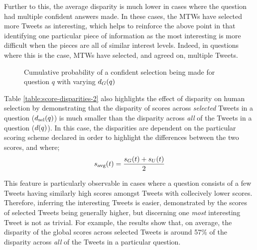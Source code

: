 Further to this, the average disparity is much lower in cases where the question had multiple confident answers made. In these cases, the MTWs have selected more Tweets as interesting, which helps to reinforce the above point in that identifying one particular piece of information as the most interesting is more difficult when the pieces are all of similar interest levels. Indeed, in questions where this is the case, MTWs have selected, and agreed on, multiple Tweets. 

 \begin{figure}[h]
\centering
{}
\caption{Cumulative probability of a confident selection being made for question $q$ with varying $d_G(q)$}
\label{fig:cum-question-disparity}
\end{figure}

Table \ref{table:score-disparities-2} also highlights the effect of disparity on human selection by demonstrating that the disparity of scores across \textit{selected} Tweets in a question ($d_{\textrm{sel}}(q)$) is much smaller than the disparity across \textit{all} of the Tweets in a question ($d(q)$). In this case, the disparities are dependent on the particular scoring scheme declared in order to highlight the differences between the two scores, and where;
\[
    s_{\textrm{avg}}(t) = \frac{s_G(t) + s_U(t)}{2}
\] 

This feature is particularly observable in cases where a question consists of a few Tweets having similarly high scores amongst Tweets with collecively lower scores. Therefore, inferring the interesting Tweets is easier, demonstrated by the scores of selected Tweets being generally higher, but discerning one \textit{most} interesting Tweet is not as trivial. For example, the results show that, on average, the disparity of the global scores across selected Tweets is around 57\% of the disparity across \textit{all} of the Tweets in a particular question.


